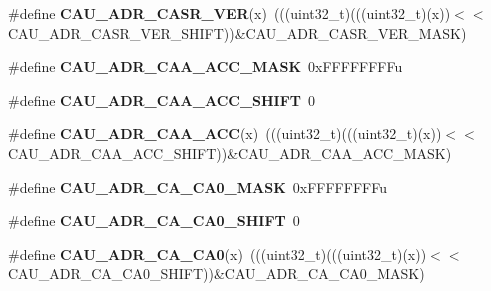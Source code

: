 \begin{DoxyCompactItemize}
\item 
\#define {\bfseries C\+A\+U\+\_\+\+A\+D\+R\+\_\+\+C\+A\+S\+R\+\_\+\+V\+ER}(x)~(((uint32\+\_\+t)(((uint32\+\_\+t)(x))$<$$<$C\+A\+U\+\_\+\+A\+D\+R\+\_\+\+C\+A\+S\+R\+\_\+\+V\+E\+R\+\_\+\+S\+H\+I\+FT))\&C\+A\+U\+\_\+\+A\+D\+R\+\_\+\+C\+A\+S\+R\+\_\+\+V\+E\+R\+\_\+\+M\+A\+SK)\hypertarget{group__CAU__Register__Masks_gaa5ee00ac2f0ef91869f7f0ec921441f6}{}\label{group__CAU__Register__Masks_gaa5ee00ac2f0ef91869f7f0ec921441f6}

\item 
\#define {\bfseries C\+A\+U\+\_\+\+A\+D\+R\+\_\+\+C\+A\+A\+\_\+\+A\+C\+C\+\_\+\+M\+A\+SK}~0x\+F\+F\+F\+F\+F\+F\+F\+Fu\hypertarget{group__CAU__Register__Masks_gacc0c6924fefc7cc98506f9c0d031d9b4}{}\label{group__CAU__Register__Masks_gacc0c6924fefc7cc98506f9c0d031d9b4}

\item 
\#define {\bfseries C\+A\+U\+\_\+\+A\+D\+R\+\_\+\+C\+A\+A\+\_\+\+A\+C\+C\+\_\+\+S\+H\+I\+FT}~0\hypertarget{group__CAU__Register__Masks_gaf629b44286a47b9d05d74250f509747a}{}\label{group__CAU__Register__Masks_gaf629b44286a47b9d05d74250f509747a}

\item 
\#define {\bfseries C\+A\+U\+\_\+\+A\+D\+R\+\_\+\+C\+A\+A\+\_\+\+A\+CC}(x)~(((uint32\+\_\+t)(((uint32\+\_\+t)(x))$<$$<$C\+A\+U\+\_\+\+A\+D\+R\+\_\+\+C\+A\+A\+\_\+\+A\+C\+C\+\_\+\+S\+H\+I\+FT))\&C\+A\+U\+\_\+\+A\+D\+R\+\_\+\+C\+A\+A\+\_\+\+A\+C\+C\+\_\+\+M\+A\+SK)\hypertarget{group__CAU__Register__Masks_ga7070ca5dd02de1404c00f544caeb11c6}{}\label{group__CAU__Register__Masks_ga7070ca5dd02de1404c00f544caeb11c6}

\item 
\#define {\bfseries C\+A\+U\+\_\+\+A\+D\+R\+\_\+\+C\+A\+\_\+\+C\+A0\+\_\+\+M\+A\+SK}~0x\+F\+F\+F\+F\+F\+F\+F\+Fu\hypertarget{group__CAU__Register__Masks_ga414839bf216530416ea2338f5027fd46}{}\label{group__CAU__Register__Masks_ga414839bf216530416ea2338f5027fd46}

\item 
\#define {\bfseries C\+A\+U\+\_\+\+A\+D\+R\+\_\+\+C\+A\+\_\+\+C\+A0\+\_\+\+S\+H\+I\+FT}~0\hypertarget{group__CAU__Register__Masks_ga2e21fe07cc0b8acdef6e46075cc75770}{}\label{group__CAU__Register__Masks_ga2e21fe07cc0b8acdef6e46075cc75770}

\item 
\#define {\bfseries C\+A\+U\+\_\+\+A\+D\+R\+\_\+\+C\+A\+\_\+\+C\+A0}(x)~(((uint32\+\_\+t)(((uint32\+\_\+t)(x))$<$$<$C\+A\+U\+\_\+\+A\+D\+R\+\_\+\+C\+A\+\_\+\+C\+A0\+\_\+\+S\+H\+I\+FT))\&C\+A\+U\+\_\+\+A\+D\+R\+\_\+\+C\+A\+\_\+\+C\+A0\+\_\+\+M\+A\+SK)\hypertarget{group__CAU__Register__Masks_ga74e5e963432638577dc5004cf9ac7954}{}\label{group__CAU__Register__Masks_ga74e5e963432638577dc5004cf9ac7954}


\end{DoxyCompactItemize}

